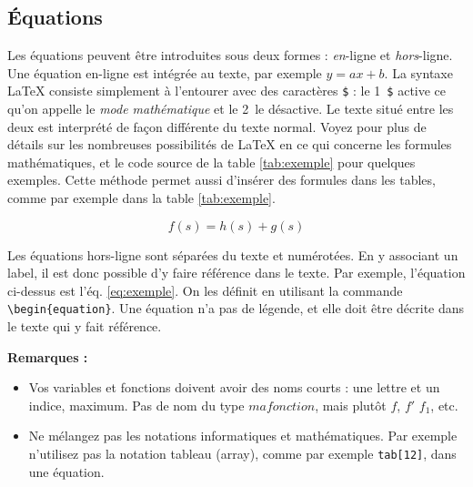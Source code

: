\documentclass{ASD}
\begin{document}
\subsection{Équations}
\label{sec:equations}
Les équations peuvent être introduites sous deux formes : \textit{en}-ligne et \textit{hors}-ligne. Une équation en-ligne est intégrée au texte, par exemple $y=ax+b$. La syntaxe \LaTeX{} consiste simplement à l'entourer avec des caractères \texttt{\$} : le 1\ier~\texttt{\$} active ce qu'on appelle le \textit{mode mathématique} et le 2\ieme~le désactive. Le texte situé entre les deux est interprété de façon différente du texte normal. Voyez \cite{Wikibooks2010, Wikibooks2011} pour plus de détails sur les nombreuses possibilités de \LaTeX{} en ce qui concerne les formules mathématiques, et le code source de la table \ref{tab:exemple} pour quelques exemples. Cette méthode permet aussi d'insérer des formules dans les tables, comme par exemple dans la table \ref{tab:exemple}.

\begin{equation}
	f(s)=h(s)+g(s)
	\label{eq:exemple}
\end{equation}

Les équations hors-ligne sont séparées du texte et numérotées. En y associant un label, il est donc possible d'y faire référence dans le texte. Par exemple, l'équation ci-dessus est l'éq. \ref{eq:exemple}. On les définit en utilisant la commande \texttt{\textbackslash{}begin\{equation\}}. Une équation n'a pas de légende, et elle doit être décrite dans le texte qui y fait référence.

\textbf{Remarques :}
\begin{itemize}
	\item Vos variables et fonctions doivent avoir des noms courts : une lettre et un indice, maximum. Pas de nom du type ${mafonction}$, mais plutôt $f$, $f'$ $f_1$, etc\@.
	\item Ne mélangez pas les notations informatiques et mathématiques. Par exemple n'utilisez pas la notation tableau (array), comme par exemple \texttt{tab[12]}, dans une équation.
\end{itemize}
	
\end{document}
